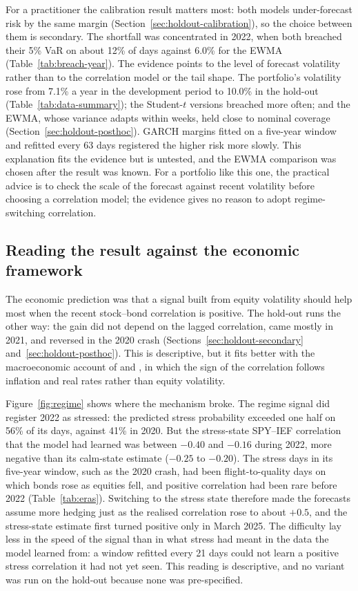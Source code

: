 For a practitioner the calibration result matters most: both models under-forecast risk by the same margin (Section~\ref{sec:holdout-calibration}), so the choice between them is secondary. The shortfall was concentrated in 2022, when both breached their 5\% VaR on about 12\% of days against 6.0\% for the EWMA (Table~\ref{tab:breach-year}). The evidence points to the level of forecast volatility rather than to the correlation model or the tail shape. The portfolio's volatility rose from 7.1\% a year in the development period to 10.0\% in the hold-out (Table~\ref{tab:data-summary}); the Student-$t$ versions breached more often; and the EWMA, whose variance adapts within weeks, held close to nominal coverage (Section~\ref{sec:holdout-posthoc}). GARCH margins fitted on a five-year window and refitted every 63 days registered the higher risk more slowly. This explanation fits the evidence but is untested, and the EWMA comparison was chosen after the result was known. For a portfolio like this one, the practical advice is to check the scale of the forecast against recent volatility before choosing a correlation model; the evidence gives no reason to adopt regime-switching correlation.

\subsection{Reading the result against the economic framework}\label{sec:disc-slow}

The economic prediction was that a signal built from equity volatility should help most when the recent stock--bond correlation is positive. The hold-out runs the other way: the gain did not depend on the lagged correlation, came mostly in 2021, and reversed in the 2020 crash (Sections~\ref{sec:holdout-secondary} and~\ref{sec:holdout-posthoc}). This is descriptive, but it fits better with the macroeconomic account of \citet{campbell2020} and \citet{molenaar2024}, in which the sign of the correlation follows inflation and real rates rather than equity volatility.

Figure~\ref{fig:regime} shows where the mechanism broke. The regime signal did register 2022 as stressed: the predicted stress probability exceeded one half on 56\% of its days, against 41\% in 2020. But the stress-state SPY--IEF correlation that the model had learned was between $-0.40$ and $-0.16$ during 2022, more negative than its calm-state estimate ($-0.25$ to $-0.20$). The stress days in its five-year window, such as the 2020 crash, had been flight-to-quality days on which bonds rose as equities fell, and positive correlation had been rare before 2022 (Table~\ref{tab:eras}). Switching to the stress state therefore made the forecasts assume more hedging just as the realised correlation rose to about $+0.5$, and the stress-state estimate first turned positive only in March 2025. The difficulty lay less in the speed of the signal than in what stress had meant in the data the model learned from: a window refitted every 21 days could not learn a positive stress correlation it had not yet seen. This reading is descriptive, and no variant was run on the hold-out because none was pre-specified.

